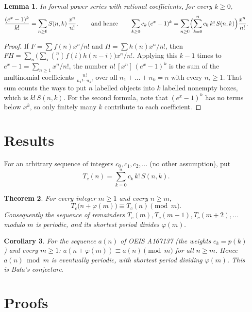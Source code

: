 \documentclass[11pt,a4paper]{article}
\newtheorem{theorem}{Theorem}[section]
\newtheorem{lemma}[theorem]{Lemma}
\newtheorem{corollary}[theorem]{Corollary}
\theoremstyle{definition}
\theoremstyle{remark}
\newcommand{\coeff}[2]{[x^{#1}]\,#2}
\begin{document}
\begin{lemma}\label{lem:egf}
In formal power series with rational coefficients, for every $k\ge0$,
\[
\frac{(e^x-1)^k}{k!}=\sum_{n\ge0}S(n,k)\,\frac{x^n}{n!},
\qquad\text{and hence}\qquad
\sum_{k\ge0}c_k\,(e^x-1)^k=\sum_{n\ge0}\Bigl(\sum_{k=0}^nc_k\,k!\,S(n,k)\Bigr)\frac{x^n}{n!}.
\]
\end{lemma}

\begin{proof}
If $F=\sum f(n)x^n/n!$ and $H=\sum h(n)x^n/n!$, then $FH=\sum_n\bigl(\sum_i\binom ni f(i)h(n-i)\bigr)x^n/n!$. Applying this
$k-1$ times to $e^x-1=\sum_{n\ge1}x^n/n!$, the number $n!\,\coeff{n}{(e^x-1)^k}$ is the sum of the multinomial coefficients
$\frac{n!}{n_1!\cdots n_k!}$ over all $n_1+\dots+n_k=n$ with every $n_i\ge1$. That sum counts the ways to put $n$ labelled
objects into $k$ labelled nonempty boxes, which is $k!\,S(n,k)$. For the second formula, note that $(e^x-1)^k$ has no
terms below $x^k$, so only finitely many $k$ contribute to each coefficient.
\end{proof}


\section{Results}\label{sec:results}

For an arbitrary sequence of integers $c_0,c_1,c_2,\dots$ (no other assumption), put
\begin{equation}\label{eq:transform}
T_c(n)=\sum_{k=0}^{n}c_k\,k!\,S(n,k).
\end{equation}

\begin{theorem}\label{thm:main}
For every integer $m\ge1$ and every $n\ge m$,
\[
T_c\bigl(n+\varphi(m)\bigr)\equiv T_c(n)\pmod m .
\]
Consequently the sequence of remainders $T_c(m),T_c(m+1),T_c(m+2),\dots$ modulo $m$ is periodic, and its shortest period
divides $\varphi(m)$.
\end{theorem}

\begin{corollary}\label{cor:seq}
For the sequence $a(n)$ of OEIS A167137 (the weights $c_k=p(k)$) and every $m\ge1$:
$a(n+\varphi(m))\equiv a(n)\pmod m$ for all $n\ge m$. Hence $a(n)\bmod m$ is eventually periodic, with shortest period
dividing $\varphi(m)$. This is Bala's conjecture.
\end{corollary}

\section{Proofs}\label{sec:proofs}
\end{document}
